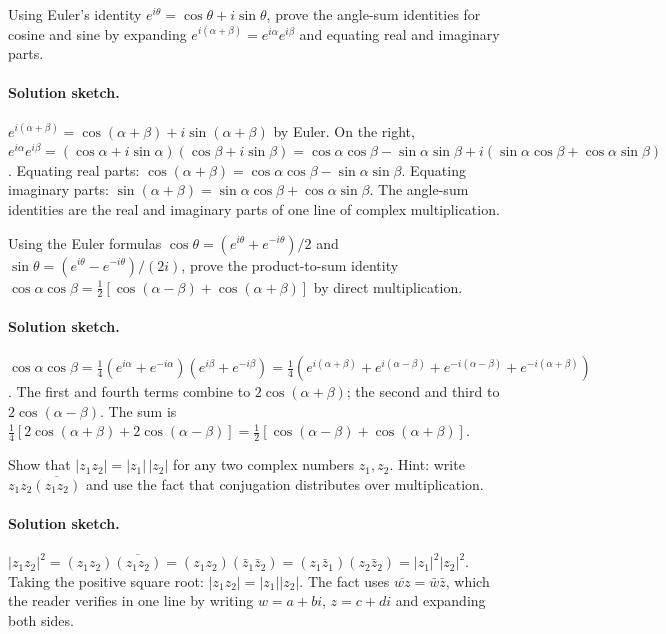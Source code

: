\begin{exercise}
Using Euler's identity $e^{i\theta} = \cos\theta + i\sin\theta$,
prove the angle-sum identities for cosine and sine by expanding
$e^{i(\alpha + \beta)} = e^{i\alpha} e^{i\beta}$ and equating real
and imaginary parts.

\paragraph{Solution sketch.}
$e^{i(\alpha + \beta)} = \cos(\alpha + \beta) + i\sin(\alpha +
\beta)$ by Euler. On the right, $e^{i\alpha} e^{i\beta} =
(\cos\alpha + i\sin\alpha)(\cos\beta + i\sin\beta) =
\cos\alpha\cos\beta - \sin\alpha\sin\beta + i(\sin\alpha\cos\beta
+ \cos\alpha\sin\beta)$. Equating real parts: $\cos(\alpha + \beta)
= \cos\alpha\cos\beta - \sin\alpha\sin\beta$. Equating imaginary
parts: $\sin(\alpha + \beta) = \sin\alpha\cos\beta + \cos\alpha
\sin\beta$. The angle-sum identities are the real and imaginary
parts of one line of complex multiplication.
\end{exercise}

\begin{exercise}
Using the Euler formulas $\cos\theta = (e^{i\theta} +
e^{-i\theta})/2$ and $\sin\theta = (e^{i\theta} - e^{-i\theta})/(2i)$,
prove the product-to-sum identity $\cos\alpha\cos\beta =
\tfrac{1}{2}[\cos(\alpha - \beta) + \cos(\alpha + \beta)]$ by
direct multiplication.

\paragraph{Solution sketch.}
$\cos\alpha\cos\beta = \tfrac{1}{4}(e^{i\alpha} + e^{-i\alpha})
(e^{i\beta} + e^{-i\beta}) = \tfrac{1}{4}(e^{i(\alpha + \beta)} +
e^{i(\alpha - \beta)} + e^{-i(\alpha - \beta)} + e^{-i(\alpha +
\beta)})$. The first and fourth terms combine to $2\cos(\alpha
+ \beta)$; the second and third to $2\cos(\alpha - \beta)$. The
sum is $\tfrac{1}{4}[2\cos(\alpha + \beta) + 2\cos(\alpha -
\beta)] = \tfrac{1}{2}[\cos(\alpha - \beta) + \cos(\alpha +
\beta)]$.
\end{exercise}

\begin{exercise}
Show that $|z_{1} z_{2}| = |z_{1}|\,|z_{2}|$ for any two complex
numbers $z_{1}, z_{2}$. Hint: write $z_{1} z_{2} \overline{(z_{1}
z_{2})}$ and use the fact that conjugation distributes over
multiplication.

\paragraph{Solution sketch.}
$|z_{1} z_{2}|^{2} = (z_{1} z_{2})\overline{(z_{1} z_{2})} =
(z_{1} z_{2})(\bar z_{1} \bar z_{2}) = (z_{1} \bar z_{1})(z_{2}
\bar z_{2}) = |z_{1}|^{2} |z_{2}|^{2}$. Taking the positive square
root: $|z_{1} z_{2}| = |z_{1}||z_{2}|$. The fact uses
$\overline{wz} = \bar w \bar z$, which the reader verifies in one
line by writing $w = a + bi$, $z = c + di$ and expanding both sides.
\end{exercise}

